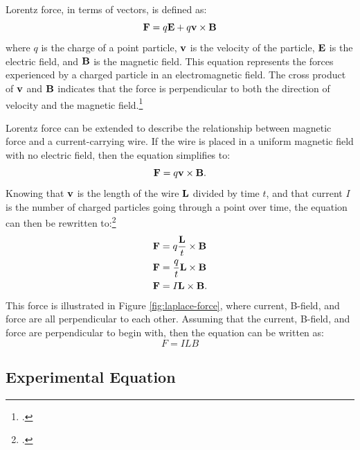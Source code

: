 Lorentz force, in terms of vectors, is defined as:
\begin{equation*}
	\bm{\mathbf{F}} = q\bm{\mathbf{E}} + q\bm{\mathbf{v}} \times \bm{\mathbf{B}}
\end{equation*}
where $q$ is the charge of a point particle, $\bm{\mathbf{v}}$ is the velocity of the particle, $\bm{\mathbf{E}}$ is the electric field, and $\bm{\mathbf{B}}$ is the magnetic field.
This equation represents the forces experienced by a charged particle in an electromagnetic field.
The cross product of $\bm{\mathbf{v}}$ and $\bm{\mathbf{B}}$ indicates that the force is perpendicular to both the direction of velocity and the magnetic field.\footcite{navelorentz}

\newpage

Lorentz force can be extended to describe the relationship between magnetic force and a current-carrying wire.
If the wire is placed in a uniform magnetic field with no electric field, then the equation simplifies to:
\begin{equation*}
	\bm{\mathbf{F}} = q\bm{\mathbf{v}} \times \bm{\mathbf{B}} \text{.}
\end{equation*}
Knowing that $\bm{\mathbf{v}}$ is the length of the wire $\bm{\mathbf{L}}$ divided by time $t$, and that current $I$ is the number of charged particles going through a point over time, the equation can then be rewritten to:\footcite{navelaplace}
\begin{align*}
	\bm{\mathbf{F}} &= q\frac{\bm{\mathbf{L}}}{t} \times \bm{\mathbf{B}} \\
	\bm{\mathbf{F}} &= \frac{q}{t}\bm{\mathbf{L}} \times \bm{\mathbf{B}} \\
	\bm{\mathbf{F}} &= I\bm{\mathbf{L}} \times \bm{\mathbf{B}} \text{.}
\end{align*}
This force is illustrated in Figure \ref{fig:laplace-force}, where current, B-field, and force are all perpendicular to each other.
Assuming that the current, B-field, and force are perpendicular to begin with, then the equation can be written as:
\begin{equation}
	F = ILB \label{eqn:laplace}
\end{equation}

\subsection*{Experimental Equation}

